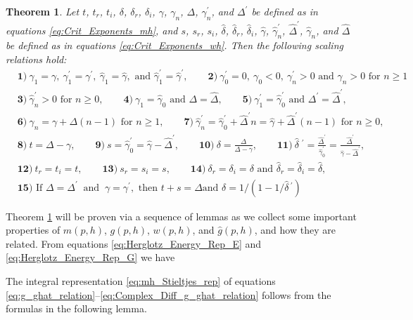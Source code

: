 \documentclass[jmp,graphicx]{revtex4-1}
\newtheorem{theorem}{Theorem}[section]
\newcommand{\gh}{\hat{\gamma}}
\newcommand{\Dh}{\hat{\Delta}}
\newcommand{\dha}{\hat{\delta}}
\begin{document}
\begin{theorem} \label{thm:Crit_Theory_m_w}
  Let $t$, $t_r$, $t_i$, $\delta$, $\delta_r$, $\delta_i$, $\gamma$, $\gamma_n$, $\Delta$, $\gamma_n^\prime$,
  and $\Delta^\prime$ be   defined as in equations \eqref{eq:Crit_Exponents_mh},
  and $s$, $s_r$, $s_i$, $\dha$, $\dha_r$, $\dha_i$, $\gh$, $\gh_n^\prime$,
  $\Dh^\prime$, $\gh_n$, and $\Dh$ be defined as in equations
  \eqref{eq:Crit_Exponents_wh}. Then the following scaling relations
  hold:
%  
  \begin{align*}   
   &\mathbf{1)} \ \gamma_1=\gamma, \ \gamma_1^\prime=\gamma^\prime, \ \gh_1=\gh, \text{ and } \gh_1^\prime=\gh^\prime, \qquad
     \mathbf{2)} \ \gamma_0^\prime=0, \ \gamma_0<0, \ \gamma_n^\prime>0 \text{ and } \gamma_n>0 \text{ for } n\geq1\\
   &\mathbf{3)} \ \gh_n^\prime>0 \text{ for } n\geq0, \qquad
   \mathbf{4)} \ \gamma_1=\gh_0 \text{ and } \Delta=\Dh, \qquad
   \mathbf{5)} \ \gamma_1^\prime=\gh_0^\prime \text{ and } \Delta^\prime=\Dh^\prime, \\
   &\mathbf{6)} \ \gamma_n=\gamma+\Delta(n-1) \text{ for } n\geq1, \qquad
   \mathbf{7)} \ \gh_n^\prime=\gh_0^\prime+\Dh^\prime n=\gh+\Dh^\prime(n-1) \text{ for } n\geq0, \\
   &\mathbf{8)} \ t=\Delta-\gamma, \qquad 
   \mathbf{9)} \ s=\gh_0^\prime=\gh-\Dh^\prime, \qquad
   \mathbf{10)} \ \delta=\frac{\Delta}{\Delta-\gamma}, \qquad
   \mathbf{11)} \ \dha\;^\prime=\frac{\Dh^\prime}{\gh_0^\prime}=\frac{\Dh^\prime}{\gh-\Dh^\prime}, \\
   &\mathbf{12)} \ t_r=t_i=t, \qquad
   \mathbf{13)} \ s_r=s_i=s, \qquad
   \mathbf{14)} \ \delta_r=\delta_i=\delta \text{ and } \dha_r=\dha_i=\dha, \\
   &\mathbf{15)} \text{ If } \Delta=\Delta^\prime \ \text{ and } \ \gamma=\gamma^\prime, \text{ then } t+s=\Delta \text{
     and }  \delta=1/(1-1/\dha\,^\prime)
  \end{align*}
%  
\end{theorem}
%

Theorem \ref{thm:Crit_Theory_m_w} will be proven via a sequence of
lemmas as we collect some important properties of $m(p,h)$, $g(p,h)$,
$w(p,h)$, and $\hat{g}(p,h)$, and how they are related. From equations
\eqref{eq:Herglotz_Energy_Rep_E} and \eqref{eq:Herglotz_Energy_Rep_G}
we have   


The integral representation \eqref{eq:mh_Stieltjes_rep} of equations
\eqref{eq:g_ghat_relation}--\eqref{eq:Complex_Diff_g_ghat_relation}
follows from the formulas in the following lemma.
\end{document}
